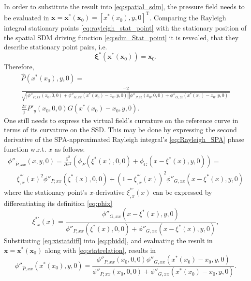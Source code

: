 \documentclass[12pt,a4paper]{article}
\newcommand{\ti}{\mathrm{j}}
\newcommand{\vx}{\mathbf{x}}
\newcommand{\vxi}{\bm{\xi}}
\newcommand{\vxo}{\mathbf{x}_0}
\begin{document}
In order to substitute the result into \eqref{eq:spatial_sdm}, the pressure field needs to be evaluated in $\vx = \vx^*(\vxo) = [x^*(x_0), y, 0]^{\mathrm{T}}$.
Comparing the Rayleigh integral stationary points \eqref{eq:rayleigh_stat_point} with the stationary position of the spatial SDM driving function \eqref{eq:sdm_Stat_point} it is revealed, that they describe stationary point pairs, i.e.
%
\begin{equation}
\vxi^*(\vx^*(\vx_0)) = \vx_0
\label{eq:statrelation}
.
\end{equation}
%
Therefore,
%
\begin{multline}
\hat{P}(x^*(x_0),y,0) = \\ \frac{-2}{\sqrt{ 
\left| \phi''_{P,xx}(x_0,0,0) + \phi''_{G,xx}(x^*(x_0) - x_0,y,0) \right|
\left| \phi''_{P,zz}(x_0,0,0	) + \phi''_{G,zz}(x^*(x_0) - x_0,y,0) \right|
}}
\\
 \frac{2\pi}{\ti}  P'_y(x_0,0,0) G(x^*(x_0) - x_0,y,0).
 \label{eq:rayleighPfinal}
\end{multline}
%
One still needs to express the virtual field's curvature on the reference curve in terms of its curvature on the SSD.
This may be done by expressing the second derivative of the SPA-approximated Rayleigh integral's \eqref{eq:Rayleigh_SPA} phase function w.r.t. $x$ as follows:
%
\begin{multline}
\phi''_{\hat{P},xx}(x,y,0) = 
\frac{\partial^2}{\partial x^2} \left( \phi_P(\xi^*(x),0,0) + \phi_G(x-\xi^*(x),y,0) \right) = \\
=   \xi^{*'}_{,x}(x)^2 \phi''_{P,xx}(\xi^*(x),0,0) + (1-\xi^{*'}_{,x}(x))^2\phi''_{G,xx	}(x-\xi^*(x),y,0)
\label{eq:phidd}
\end{multline}
%
where the stationary point's $x$-derivative $\xi^{*'}_{,x}(x)$ can be expressed by differentiating its definition \eqref{eq:phix}
%
\begin{equation}
\xi^{*'}_{,x}(x) =  \frac{ \phi''_{G,xx}(x-\xi^*(x),y,0) }{\phi''_{P,xx}(\xi^*(x),0,0) + \phi''_{G,xx}(x-\xi^*(x),y,0) },
\label{eq:xistatdiff}
\end{equation}
%
Substituting \eqref{eq:xistatdiff} into \eqref{eq:phidd}, and evaluating the result in $\vx = \vx^*(\vxo)$ along with \eqref{eq:statrelation}, results in
%
\begin{equation}
\phi''_{\hat{P},xx}(x^*(x_0),y,0)  =
\frac{ \phi''_{P,xx}(x_0,0,0) \phi''_{G,xx}(x^*(x_0)-x_0,y,0) }
{\phi''_{P,xx}(x_0,0,0) + \phi''_{G,xx}(x^*(x_0)-x_0,y,0) } .
\label{eq:rayleighphasefinal}
\end{equation}
\end{document}
